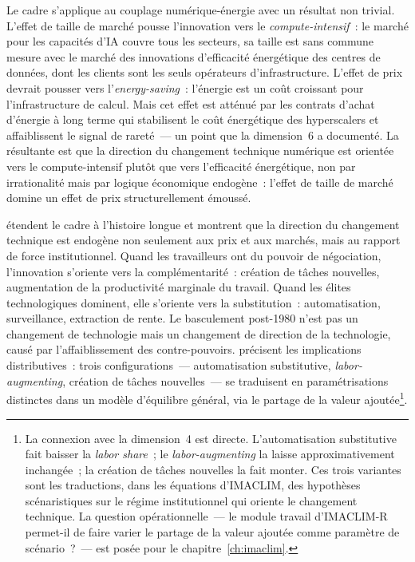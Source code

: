 Le cadre s'applique au couplage numérique-énergie avec un résultat non trivial. L'effet de taille de marché pousse l'innovation vers le \emph{compute-intensif}~: le marché pour les capacités d'IA couvre tous les secteurs, sa taille est sans commune mesure avec le marché des innovations d'efficacité énergétique des centres de données, dont les clients sont les seuls opérateurs d'infrastructure. L'effet de prix devrait pousser vers l'\emph{energy-saving}~: l'énergie est un coût croissant pour l'infrastructure de calcul. Mais cet effet est atténué par les contrats d'achat d'énergie à long terme qui stabilisent le coût énergétique des hyperscalers et affaiblissent le signal de rareté~--- un point que la dimension~6 a documenté. La résultante est que la direction du changement technique numérique est orientée vers le compute-intensif plutôt que vers l'efficacité énergétique, non par irrationalité mais par logique économique endogène~: l'effet de taille de marché domine un effet de prix structurellement émoussé.

\textcite{acemoglu_power_2023} étendent le cadre à l'histoire longue et montrent que la direction du changement technique est endogène non seulement aux prix et aux marchés, mais au rapport de force institutionnel. Quand les travailleurs ont du pouvoir de négociation, l'innovation s'oriente vers la complémentarité~: création de tâches nouvelles, augmentation de la productivité marginale du travail. Quand les élites technologiques dominent, elle s'oriente vers la substitution~: automatisation, surveillance, extraction de rente. Le basculement post-1980 n'est pas un changement de technologie mais un changement de direction de la technologie, causé par l'affaiblissement des contre-pouvoirs. \textcite{acemoglu_building_2026} précisent les implications distributives~: trois configurations~--- automatisation substitutive, \emph{labor-augmenting}, création de tâches nouvelles~--- se traduisent en paramétrisations distinctes dans un modèle d'équilibre général, via le partage de la valeur ajoutée\footnote{La connexion avec la dimension~4 est directe. L'automatisation substitutive fait baisser la \emph{labor share}~; le \emph{labor-augmenting} la laisse approximativement inchangée~; la création de tâches nouvelles la fait monter. Ces trois variantes sont les traductions, dans les équations d'IMACLIM, des hypothèses scénaristiques sur le régime institutionnel qui oriente le changement technique. La question opérationnelle~--- le module travail d'IMACLIM-R permet-il de faire varier le partage de la valeur ajoutée comme paramètre de scénario~?~--- est posée pour le chapitre~\ref{ch:imaclim}.}.

